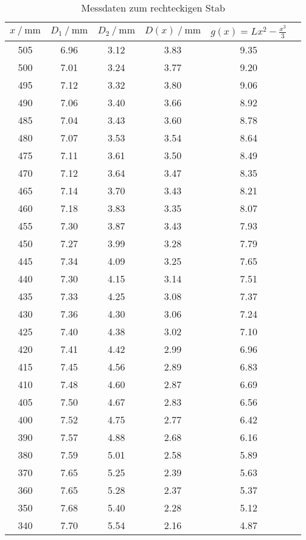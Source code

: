 \begin{table}
  \centering
  \caption{Messdaten zum rechteckigen Stab}
  \label{tab:Rechteckwerte}
  \begin{tabular}{c c c c c c}
    \toprule
      $x\:/\:\si{\milli\meter}$ & $D_1\:/\:\si{\milli\meter}$ & $D_2\:/\:\si{\milli\meter}$ & $D(x)\:/\:\si{\milli\meter}$ & $g(x)=Lx^2-\frac{x^3}{3}$ \\
    \midrule
    505 & 6.96 & 3.12 & 3.83 & 9.35 \\
    500 & 7.01 & 3.24 & 3.77 & 9.20 \\
    495 & 7.12 & 3.32 & 3.80 & 9.06 \\
    490 & 7.06 & 3.40 & 3.66 & 8.92 \\
    485 & 7.04 & 3.43 & 3.60 & 8.78 \\
    480 & 7.07 & 3.53 & 3.54 & 8.64 \\
    475 & 7.11 & 3.61 & 3.50 & 8.49 \\
    470 & 7.12 & 3.64 & 3.47 & 8.35 \\
    465 & 7.14 & 3.70 & 3.43 & 8.21 \\
    460 & 7.18 & 3.83 & 3.35 & 8.07 \\
    455 & 7.30 & 3.87 & 3.43 & 7.93 \\
    450 & 7.27 & 3.99 & 3.28 & 7.79 \\
    445 & 7.34 & 4.09 & 3.25 & 7.65 \\
    440 & 7.30 & 4.15 & 3.14 & 7.51 \\
    435 & 7.33 & 4.25 & 3.08 & 7.37 \\
    430 & 7.36 & 4.30 & 3.06 & 7.24 \\
    425 & 7.40 & 4.38 & 3.02 & 7.10 \\
    420 & 7.41 & 4.42 & 2.99 & 6.96 \\
    415 & 7.45 & 4.56 & 2.89 & 6.83 \\
    410 & 7.48 & 4.60 & 2.87 & 6.69 \\
    405 & 7.50 & 4.67 & 2.83 & 6.56 \\
    400 & 7.52 & 4.75 & 2.77 & 6.42 \\
    390 & 7.57 & 4.88 & 2.68 & 6.16 \\
    380 & 7.59 & 5.01 & 2.58 & 5.89 \\
    370 & 7.65 & 5.25 & 2.39 & 5.63 \\
    360 & 7.65 & 5.28 & 2.37 & 5.37 \\
    350 & 7.68 & 5.40 & 2.28 & 5.12 \\
    340 & 7.70 & 5.54 & 2.16 & 4.87 \\

\end{tabular}
\end{table}
